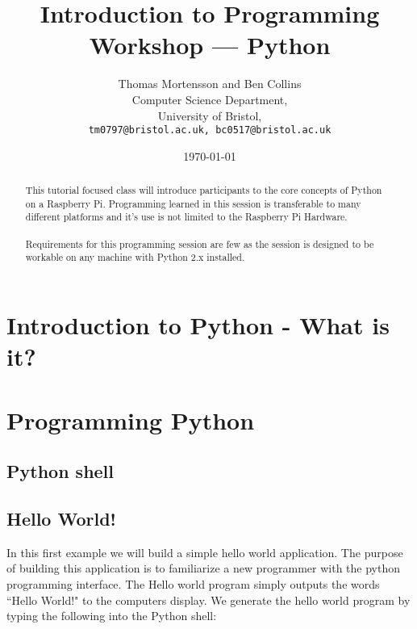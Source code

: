 \documentclass[twocolumn]{article}
\begin{document}
\lstset{style=Style1}

\title{Introduction to Programming Workshop --- Python} 
\author{Thomas Mortensson and Ben Collins\\
        	Computer Science Department,\\
		University of Bristol,\\
		\texttt{tm0797@bristol.ac.uk, 
		bc0517@bristol.ac.uk}} 
\date{\today} 
\maketitle

\begin{abstract}
This tutorial focused class will introduce participants to the core concepts of Python on a Raspberry Pi. Programming learned in this session is transferable to many different platforms and it's use is not limited to the Raspberry Pi Hardware.\\
\\
Requirements for this programming session are  few as the session is designed to be workable on any machine with Python 2.x installed.
\end{abstract}

\section{Introduction to Python - What is it?}

\section {Programming Python}



\subsection{Python shell}

\subsection{Hello World!}

In this first example we will build a simple hello world application. The purpose of building this application is to familiarize a new programmer with the python programming interface. The Hello world program simply outputs the words ``Hello World!" to the computers display. We generate the hello world program by typing the following into the Python shell:\\
\end{document}
